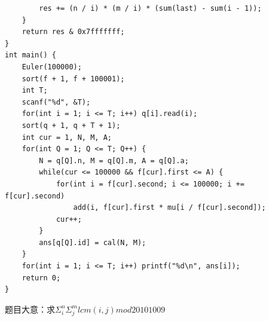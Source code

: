 \documentclass[10pt]{ctexart}
\begin{document}
{\begin{lstlisting}
        res += (n / i) * (m / i) * (sum(last) - sum(i - 1));
    }
    return res & 0x7fffffff;
}
int main() {
    Euler(100000);
    sort(f + 1, f + 100001);
    int T;
    scanf("%d", &T);
    for(int i = 1; i <= T; i++) q[i].read(i);
    sort(q + 1, q + T + 1);
    int cur = 1, N, M, A;
    for(int Q = 1; Q <= T; Q++) {
        N = q[Q].n, M = q[Q].m, A = q[Q].a;
        while(cur <= 100000 && f[cur].first <= A) {
            for(int i = f[cur].second; i <= 100000; i += f[cur].second)
                add(i, f[cur].first * mu[i / f[cur].second]);
            cur++;
        }
        ans[q[Q].id] = cal(N, M);
    }
    for(int i = 1; i <= T; i++) printf("%d\n", ans[i]);
    return 0;
}
\end{lstlisting}

题目大意：求$\Sigma_i^n\Sigma_j^mlcm(i, j) mod 20101009$\\

}
\end{document}
